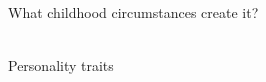 \documentclass[aspectratio=169]{beamer}
\begin{document}
\begin{frame}
  \begin{center}
    \Huge What childhood circumstances create it?
    \\ \small \cite{sakulku11}
    \\ \small \cite{langford93}
  \end{center}
\end{frame}

\begin{frame}
  \begin{center}
    \Huge Personality traits
    \small
    \\ \small \cite{hh15}
    \\ \small \cite{sakulku11}
  \end{center}
\end{frame}
\end{document}
